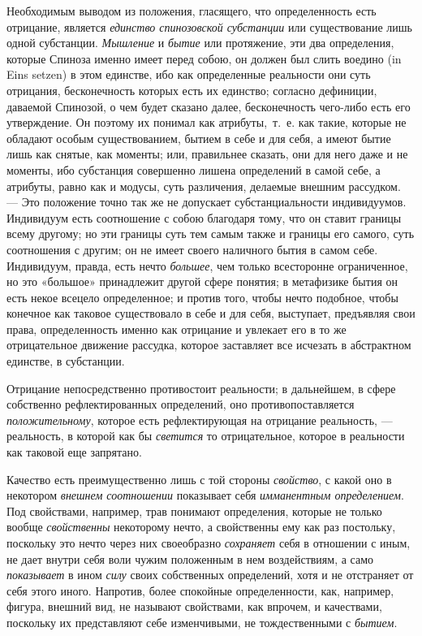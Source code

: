 Необходимым выводом из положения, гласящего, что определенность есть
отрицание, является {\em единство спинозовской
субстанции} или существование лишь одной субстанции.
{\em Мышление} и {\em бытие} или
протяжение, эти два определения, которые Спиноза именно имеет перед собою,
он должен был слить воедино (in Eins setzen) в этом единстве, ибо как
определенные реальности они суть отрицания, бесконечность которых есть их
единство; согласно дефиниции, даваемой Спинозой, о чем будет сказано далее,
бесконечность чего-либо есть его утверждение. Он поэтому их понимал как
атрибуты,~т.~е. как такие, которые не обладают особым существованием,
бытием в себе и для себя, а имеют бытие лишь как снятые, как моменты; или,
правильнее сказать, они для него даже и не моменты, ибо субстанция
совершенно лишена определений в самой себе, а атрибуты, равно как и модусы,
суть различения, делаемые внешним рассудком. — Это положение точно так же
не допускает субстанциальности индивидуумов. Индивидуум есть соотношение с
собою благодаря тому, что он ставит границы всему другому; но эти границы
суть тем самым также и границы его самого, суть соотношения с другим; он не
имеет своего наличного бытия в самом себе. Индивидуум, правда, есть нечто
{\em большее}, чем только всесторонне ограниченное, но
это «большое» принадлежит другой сфере понятия; в метафизике бытия он есть
некое всецело определенное; и против того, чтобы нечто подобное, чтобы
конечное как таковое существовало в себе и для себя, выступает, предъявляя
свои права, определенность именно как отрицание и увлекает его в то же
отрицательное движение рассудка, которое заставляет все исчезать в
абстрактном единстве, в субстанции.

Отрицание непосредственно противостоит реальности; в дальнейшем, в сфере
собственно рефлектированных определений, оно противопоставляется
{\em положительному}, которое есть рефлектирующая на
отрицание реальность, — реальность, в которой как бы
{\em светится} то отрицательное, которое в реальности
как таковой еще запрятано.

Качество есть преимущественно лишь с той стороны
{\em свойство}, с какой оно в некотором
{\em внешнем соотношении} показывает себя
{\em имманентным определением}. Под свойствами,
например, трав понимают определения, которые не только вообще
{\em свойственны} некоторому нечто, а свойственны ему
как раз постольку, поскольку это нечто через них своеобразно
{\em сохраняет} себя в отношении с иным, не
дает внутри себя воли чужим положенным в нем воздействиям, а само
{\em показывает} в ином
{\em силу} своих собственных определений, хотя и не
отстраняет от себя этого иного. Напротив, более спокойные
определенности, как, например, фигура, внешний вид, не называют
свойствами, как впрочем, и качествами, поскольку их представляют себе
изменчивыми, не тождественными с {\em бытием}.

